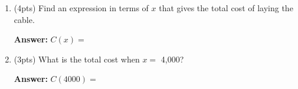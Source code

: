 \documentclass[fleqn,12pt]{article}
\newcommand{\<}{\ensuremath{\langle}}
\renewcommand{\>}{\ensuremath{\rangle}}
\begin{document}
\begin{enumerate}[label={\bf \arabic*.}]
    \begin{enumerate}[label={\bf \roman*.}]
    \item (4pts) Find an expression in terms of $x$ that gives the total cost of 
      laying the  cable.  

      \vskip4cm
      
      \hfill {\bf Answer:} 
      $C(x) = $\phantom{XXXXXXXXXXXXXXXXXXXXXXXX}\\
      \phantom{X}  \hfill \underline{\phantom{XXXXXXXXXXXXXXXXXXXXXXX}}

      \bigskip

    \item (3pts) What is the total cost when $x = $ 4,000? 

      \vfill

      \hfill {\bf Answer:} 
      $C(4000) = $\phantom{XXXXXXXXXXXXXXXXXX}\\
      \phantom{X}  \hfill \underline{\phantom{XXXXXXXXXXXXXXXX}}
    \end{enumerate}









\end{enumerate}
\end{document}
